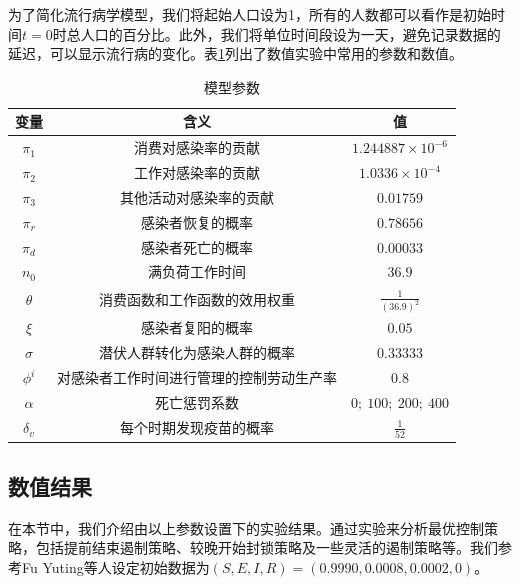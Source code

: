 为了简化流行病学模型，我们将起始人口设为1，所有的人数都可以看作是初始时间$t=0$时总人口的百分比。此外，我们将单位时间段设为一天，避免记录数据的延迟，可以显示流行病的变化。表\ref{chart}列出了数值实验中常用的参数和数值。
\begin{table}[h]
    \centering
    \caption{模型参数}\label{chart}
    \begin{tabular}{c|c|c}
        \hline
        变量 & 含义 & 值 \\
        \hline
        $\pi_1$ & 消费对感染率的贡献 & $1.244887 \times 10^{-6}$ \\
        $\pi_2$ & 工作对感染率的贡献 & $1.0336 \times 10^{-4}$\\
        $\pi_3$ & 其他活动对感染率的贡献 & $0.01759$ \\
        $\pi_r$ & 感染者恢复的概率 & $0.78656$ \\
        $\pi_d$ & 感染者死亡的概率 & $0.00033$ \\
        $n_0$ & 满负荷工作时间 & $36.9$ \\
        $\theta$ & 消费函数和工作函数的效用权重 & $\frac{1}{(36.9)^2}$ \\
        $\xi$ & 感染者复阳的概率 & $0.05$ \\
        $\sigma$ & 潜伏人群转化为感染人群的概率 & $0.33333$ \\
        $\phi^i$ & 对感染者工作时间进行管理的控制劳动生产率 & $0.8$ \\
        $\alpha$ & 死亡惩罚系数 & $0; \ 100; \ 200; \ 400$ \\
        $\delta_v$ & 每个时期发现疫苗的概率 & $\frac{1}{52}$ \\
		\hline
    \end{tabular}
    \end{table}



\vspace{35em}
\subsection{数值结果}
在本节中，我们介绍由以上参数设置下的实验结果。通过实验来分析最优控制策略，包括提前结束遏制策略、较晚开始封锁策略及一些灵活的遏制策略等。我们参考Fu Yuting\cite{fu2022optimal}等人设定初始数据为$(S,E,I,R)=(0.9990,0.0008,0.0002,0)$。

